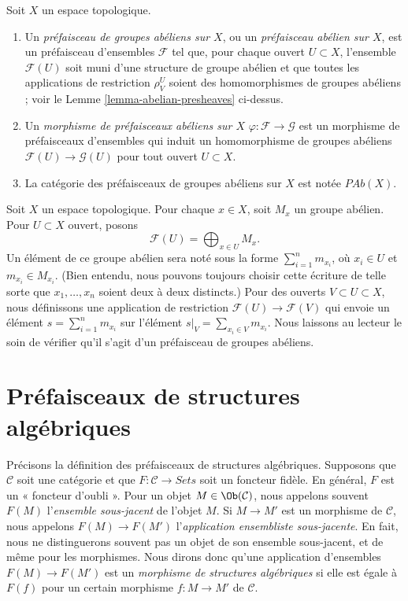 \begin{definition}
\label{definition-abelian-presheaves}
Soit $X$ un espace topologique.
\begin{enumerate}
\item Un {\it préfaisceau de groupes abéliens sur $X$}, ou un
{\it préfaisceau abélien sur $X$},
est un préfaisceau d'ensembles $\mathcal{F}$ tel que, pour chaque ouvert
$U \subset X$, l'ensemble $\mathcal{F}(U)$ soit muni
d'une structure de groupe abélien et que toutes les applications de restriction
$\rho^U_V$ soient des homomorphismes de groupes abéliens ; voir le
Lemme \ref{lemma-abelian-presheaves} ci-dessus.
\item Un {\it morphisme de préfaisceaux abéliens sur $X$}
$\varphi : \mathcal{F} \to \mathcal{G}$ est un morphisme de préfaisceaux
d'ensembles qui induit
un homomorphisme de groupes abéliens $\mathcal{F}(U) \to \mathcal{G}(U)$
pour tout ouvert $U \subset X$.
\item La catégorie des préfaisceaux de groupes abéliens sur $X$ est notée
$\textit{PAb}(X)$.
\end{enumerate}
\end{definition}

\begin{example}
\label{example-direct-sum-points}
Soit $X$ un espace topologique. Pour chaque $x \in X$, soit
$M_x$ un groupe abélien. Pour $U \subset X$ ouvert,
posons
$$
\mathcal{F}(U) = \bigoplus\nolimits_{x \in U} M_x.
$$
Un élément de ce groupe abélien sera noté sous la forme
$\sum_{i = 1}^n m_{x_i}$, où $x_i \in U$ et $m_{x_i} \in M_{x_i}$.
(Bien entendu, nous pouvons toujours choisir cette écriture de telle sorte que
$x_1, \ldots, x_n$ soient deux à deux distincts.)
Pour des ouverts $V \subset U \subset X$, nous définissons une application de
restriction $\mathcal{F}(U) \to \mathcal{F}(V)$ qui
envoie un élément $s = \sum_{i = 1}^n m_{x_i}$
sur l'élément $s|_V = \sum_{x_i \in V} m_{x_i}$.
Nous laissons au lecteur le soin de vérifier qu'il s'agit d'un
préfaisceau de groupes abéliens.
\end{example}

\section{Préfaisceaux de structures algébriques}
\label{section-presheaves-structures}

\noindent
Précisons la définition
des préfaisceaux de structures algébriques.
Supposons que $\mathcal{C}$ soit une catégorie et
que $F : \mathcal{C} \to \textit{Sets}$ soit
un foncteur fidèle. En général, $F$ est un « foncteur
d'oubli ». Pour un objet $M \in \Ob(\mathcal{C})$,
nous appelons souvent $F(M)$ l'{\it ensemble sous-jacent} de
l'objet $M$. Si $M \to M'$ est un morphisme de $\mathcal{C}$,
nous appelons $F(M) \to F(M')$ l'{\it application ensembliste sous-jacente}.
En fait, nous ne distinguerons souvent pas un objet
de son ensemble sous-jacent, et de même pour les morphismes.
Nous dirons donc qu'une application d'ensembles $F(M) \to F(M')$
est un {\it morphisme de structures algébriques} si elle est
égale à $F(f)$ pour un certain morphisme $f : M \to M'$
de $\mathcal{C}$.

